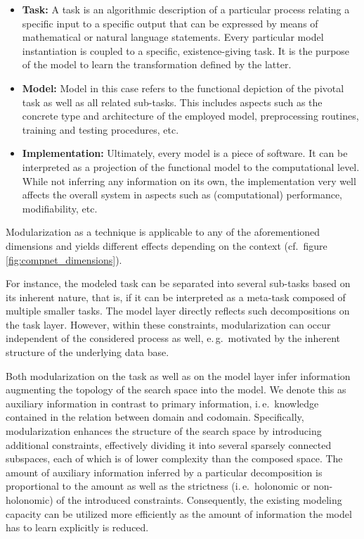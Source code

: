 \documentclass[conference]{IEEEtran}
\begin{document}
\vspace{\baselineskip}
\begin{itemize}
    \item \textbf{Task:} A task is an algorithmic description of a particular process relating a specific input to a specific output that can be expressed by means of mathematical or natural language statements. Every particular model instantiation is coupled to a specific, existence-giving task. It is the purpose of the model to learn the transformation defined by the latter.
    \item \textbf{Model:} Model in this case refers to the functional depiction of the pivotal task as well as all related sub-tasks. This includes aspects such as the concrete type and architecture of the employed model, preprocessing routines, training and testing procedures, etc.
    \item \textbf{Implementation:} Ultimately, every model is a piece of software. It can be interpreted as a projection of the functional model to the computational level. While not inferring any information on its own, the implementation very well affects the overall system in aspects such as (computational) performance, modifiability, etc.
\end{itemize}
\vspace{\baselineskip}
            
Modularization as a technique is applicable to any of the aforementioned dimensions and yields different effects depending on the context (cf.\ figure \ref{fig:compnet_dimensions}).

For instance, the modeled task can be separated into several sub-tasks based on its inherent nature, that is, if it can be interpreted as a meta-task composed of multiple smaller tasks. The model layer directly reflects such decompositions on the task layer. However, within these constraints, modularization can occur independent of the considered process as well, e.\,g.\ motivated by the inherent structure of the underlying data base.

Both modularization on the task as well as on the model layer infer information augmenting the topology of the search space into the model. We denote this as auxiliary information in contrast to primary information, i.\,e.\ knowledge contained in the relation between domain and codomain. Specifically, modularization enhances the structure of the search space by introducing additional constraints, effectively dividing it into several sparsely connected subspaces, each of which is of lower complexity than the composed space. The amount of auxiliary information inferred by a particular decomposition is proportional to the amount as well as the strictness (i.\,e.\ holonomic or non-holonomic) of the introduced constraints. Consequently, the existing modeling capacity can be utilized more efficiently as the amount of information the model has to learn explicitly is reduced.
\end{document}
